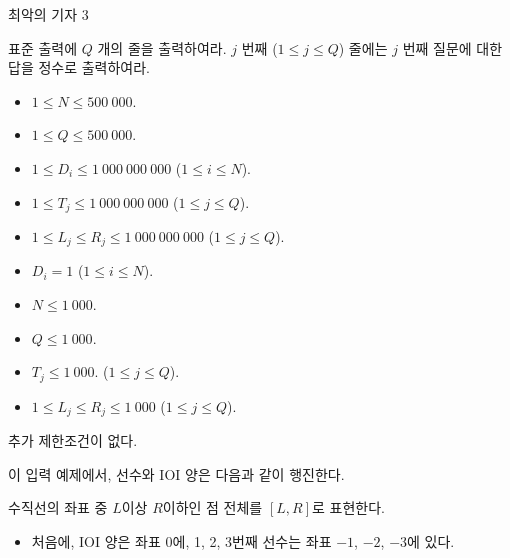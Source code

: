 \begin{problem}{최악의 기자 3}
	\OutputFile
	
	표준 출력에 $Q$ 개의 줄을 출력하여라. $j$ 번째 ($1 \le j \le Q$) 줄에는 $j$ 번째 질문에 대한 답을 정수로 출력하여라.
	
	\Constraints
	
	\begin{itemize}
		\item $1 \le N \le 500\ 000$.
		\item $1 \le Q \le 500\ 000$.
		\item $1 \le D_i \le 1\ 000\ 000\ 000$ ($1 \le i \le N$).
		\item $1 \le T_j \le 1\ 000\ 000\ 000$ ($1 \le j \le Q$).
		\item $1 \le L_j \le R_j \le 1\ 000\ 000\ 000$ ($1 \le j \le Q$).
	\end{itemize}
	
	
	\begin{itemize}
		\item $D_i = 1$ ($1 \le i \le N$).
	\end{itemize}

	\begin{itemize}
		\item $N \le 1\ 000$.
		\item $Q \le 1\ 000$.
		\item $T_j \le 1\ 000$. ($1 \le j \le Q$).
		\item $1 \le L_j \le R_j \le 1\ 000$ ($1 \le j \le Q$).
	\end{itemize}
	

	추가 제한조건이 없다.
	
	\Examples
	
	\begin{example}
	\end{example}
	
	이 입력 예제에서, 선수와 IOI 양은 다음과 같이 행진한다.
	
	수직선의 좌표 중 $L$이상 $R$이하인 점 전체를 $[L, R]$로 표현한다.
	
	\begin{itemize}
	
	\item 처음에, IOI 양은 좌표 0에, 1, 2, 3번째 선수는 좌표 $-1$, $-2$, $-3$에 있다.
	

\end{itemize}
\end{problem}
